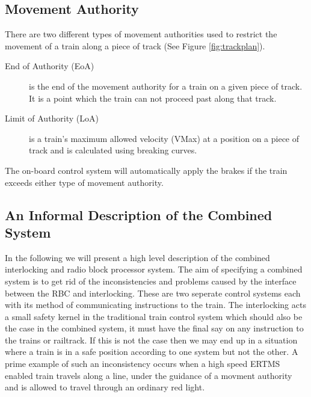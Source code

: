 \subsection*{Movement Authority}
There are two different types of movement authorities used to restrict the movement of a train along a piece of track (See Figure \ref{fig:trackplan}).
\begin{description}

\item[End of Authority (EoA)] is the end of the movement authority for a train on a given piece of track. It is a point which the train can not proceed past along that track.

\item[Limit of Authority (LoA)]
 is a train's maximum allowed velocity (VMax) at a position on a piece of track and is calculated using breaking curves.

\end{description}

The on-board control system will automatically apply the brakes if the train exceeds either type of movement authority.





\subsection*{An Informal Description of the Combined System}
In the following we will present a high level description of the combined interlocking and radio block processor system.
The aim of specifying a combined system is to get rid of the inconsistencies and problems caused by the interface between the RBC and interlocking.  These are two seperate control systems each with its method of communicating instructions to the train. The interlocking acts a small safety kernel in the traditional train control system which should also be the case in the combined system, it must have the final say on any instruction to the trains or railtrack. If this is not the case then we may end up in a situation where a train is in a safe position according to one system but not the other. A prime example of such an inconsistency occurs when a high speed ERTMS enabled train travels along a line, under the guidance of a movment authority and is allowed to travel through an ordinary red light.  


